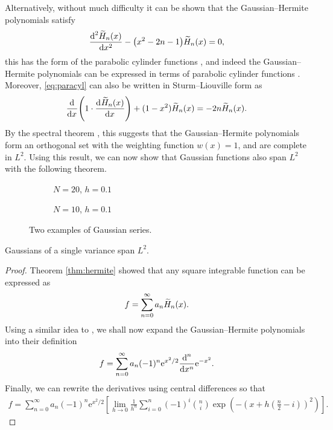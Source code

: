 Alternatively, without much difficulty it can be shown that the Gaussian--Hermite polynomials satisfy
\begin{align}
\label{eq:paracyl}
\diff[2]{\Her{n}{x}}{x} - \left( x^2 - 2n - 1 \right) \Her{n}{x} = 0,
\end{align}
this has the form of the parabolic cylinder functions \cite{miller}, and indeed the Gaussian--Hermite polynomials can be expressed in terms of parabolic cylinder functions \cite{hochstrasser, miller}. Moreover, \ref{eq:paracyl} can also be written in Sturm--Liouville form as
\begin{align*}
\diff{}{x} \left( 1 \cdot \diff{\Her{n}{x}}{x} \right) + (1 - x^2) \Her{n}{x} = -2n \Her{n}{x}.
\end{align*}
By the spectral theorem \cite{griffel, higson, kreyszig}, this suggests that the Gaussian--Hermite polynomials form an orthogonal set with the weighting function $w(x) = 1$, and are complete in $L^2$. Using this result, we can now show that Gaussian functions also span $L^2$ with the following theorem. \\

\begin{figure}[tbp]
\begin{subfigure}{0.5\textwidth}

\caption{$N = 20$, $h = 0.1$}
\end{subfigure}
\begin{subfigure}{0.5\textwidth}

\caption{$N = 10$, $h = 0.1$}
\end{subfigure}
\caption{Two examples of Gaussian series.}
\label{fig:gs}
\end{figure}

\begin{theorem}
\label{thm:gaussian}
Gaussians of a single variance span $L^2$.
\end{theorem}
\begin{proof}
Theorem \ref{thm:hermite} showed that any square integrable function can be expressed as
\begin{align*}
f = \sum_{n = 0}^\infty a_n \Her{n}{x}.
\end{align*}
Using a similar idea to \cite{calcaterra2, calcaterra}, we shall now expand the Gaussian--Hermite polynomials into their definition
\begin{align*}
f = \sum_{n = 0}^\infty a_n (-1)^n \textrm{e}^{x^2/2} \diff[n]{}{x} \textrm{e}^{-x^2}.
\end{align*}
Finally, we can rewrite the derivatives using central differences \cite{zwillinger} so that
\begin{align}
f = \sum_{n = 0}^\infty a_n (-1)^n \textrm{e}^{x^2/2} \left[ \lim_{h \rightarrow 0} \frac{1}{h^n} \sum_{i = 0}^n (-1)^i \binom{n}{i} \exp\left( -\left( x + h\left( \frac{n}{2} - i \right) \right)^2 \right) \right].
\label{eq:gs}
\end{align}
\end{proof}


